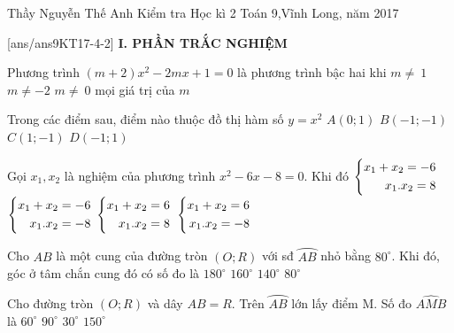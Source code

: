 \begin{name}
{Thầy  Nguyễn Thế Anh}
{Kiểm tra Học kì 2 Toán 9,Vĩnh Long, năm 2017}
\end{name}
[ans/ans9KT17-4-2]
\noindent\textbf{I. PHẦN TRẮC NGHIỆM}
\setcounter{ex}{0}
\begin{ex}%
Phương trình $\left(m+2\right)x^2-2mx+1=0$ là phương trình bậc hai khi
\choice
{$m\ne ~1$}
{\True $m\ne-2$}
{$m\ne ~0$}
{mọi giá trị của $m$}
\end{ex}
\begin{ex}%
Trong các điểm sau, điểm nào thuộc đồ thị hàm số $y=x^2$
\choice
{$A\left(0;1\right)$}
{$B\left(-1;-1\right)$}
{$C\left(1;-1\right)$}
{\True $D\left(-1;1\right)$}
\end{ex}
\begin{ex}%
Gọi $x_1,x_2$ là nghiệm của phương trình $x^2-6x-8=0$. Khi đó
\choice
{$\left\{\begin{aligned}x_1+x_2= -6\\x_1.x_2=8\end{aligned}\right.$}
{$\left\{\begin{aligned}x_1+ x_2=-6\\x_1.x_2=-8\end{aligned}\right.$}
{$\left\{\begin{aligned}x_1+ x_2=6\\x_1.x_2=8\end{aligned}\right.$}
{\True $\left\{\begin{aligned}x_1+ x_2=6\\x_1.x_2=-8\end{aligned}\right.$}
\end{ex}
\begin{ex}%
Cho $AB$ là một cung của đường tròn $(O; R)$ với sđ $\wideparen{AB}$ nhỏ bằng $80^\circ$. Khi đó, góc ở tâm chắn cung đó có số đo là
\choice
{$180^\circ$}
{$160^\circ$}
{$140^\circ$}
{\True $80^\circ$}
\end{ex}
\begin{ex}%
Cho đường tròn $(O; R)$ và dây $AB = R$. Trên $\wideparen{AB}$ lớn lấy điểm M. Số đo $\widehat{AMB}$ là
\choice
{$60^\circ$}
{$90^\circ$}
{\True $30^\circ$}
{$150^\circ$}
\end{ex}
